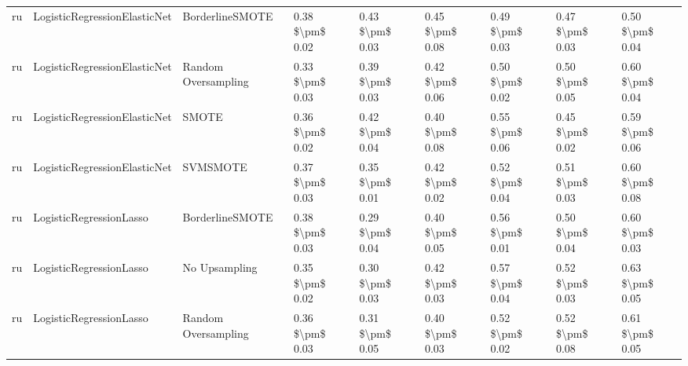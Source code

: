 \begin{tabular}{lllllllll}
      ru &    LogisticRegressionElasticNet &               BorderlineSMOTE &     0.38 \$\textbackslash pm\$ 0.02 &           0.43 \$\textbackslash pm\$ 0.03 &       0.45 \$\textbackslash pm\$ 0.08 &        0.49 \$\textbackslash pm\$ 0.03 &                         0.47 \$\textbackslash pm\$ 0.03 &     0.50 \$\textbackslash pm\$ 0.04 \\
      ru &    LogisticRegressionElasticNet &           Random Oversampling &     0.33 \$\textbackslash pm\$ 0.03 &           0.39 \$\textbackslash pm\$ 0.03 &       0.42 \$\textbackslash pm\$ 0.06 &        0.50 \$\textbackslash pm\$ 0.02 &                         0.50 \$\textbackslash pm\$ 0.05 &     0.60 \$\textbackslash pm\$ 0.04 \\
      ru &    LogisticRegressionElasticNet &                         SMOTE &     0.36 \$\textbackslash pm\$ 0.02 &           0.42 \$\textbackslash pm\$ 0.04 &       0.40 \$\textbackslash pm\$ 0.08 &        0.55 \$\textbackslash pm\$ 0.06 &                         0.45 \$\textbackslash pm\$ 0.02 &     0.59 \$\textbackslash pm\$ 0.06 \\
      ru &    LogisticRegressionElasticNet &                      SVMSMOTE &     0.37 \$\textbackslash pm\$ 0.03 &           0.35 \$\textbackslash pm\$ 0.01 &       0.42 \$\textbackslash pm\$ 0.02 &        0.52 \$\textbackslash pm\$ 0.04 &                         0.51 \$\textbackslash pm\$ 0.03 &     0.60 \$\textbackslash pm\$ 0.08 \\
      ru &         LogisticRegressionLasso &               BorderlineSMOTE &     0.38 \$\textbackslash pm\$ 0.03 &           0.29 \$\textbackslash pm\$ 0.04 &       0.40 \$\textbackslash pm\$ 0.05 &        0.56 \$\textbackslash pm\$ 0.01 &                         0.50 \$\textbackslash pm\$ 0.04 &     0.60 \$\textbackslash pm\$ 0.03 \\
      ru &         LogisticRegressionLasso &                 No Upsampling &     0.35 \$\textbackslash pm\$ 0.02 &           0.30 \$\textbackslash pm\$ 0.03 &       0.42 \$\textbackslash pm\$ 0.03 &        0.57 \$\textbackslash pm\$ 0.04 &                         0.52 \$\textbackslash pm\$ 0.03 &     0.63 \$\textbackslash pm\$ 0.05 \\
      ru &         LogisticRegressionLasso &           Random Oversampling &     0.36 \$\textbackslash pm\$ 0.03 &           0.31 \$\textbackslash pm\$ 0.05 &       0.40 \$\textbackslash pm\$ 0.03 &        0.52 \$\textbackslash pm\$ 0.02 &                         0.52 \$\textbackslash pm\$ 0.08 &     0.61 \$\textbackslash pm\$ 0.05 \\

\end{tabular}
